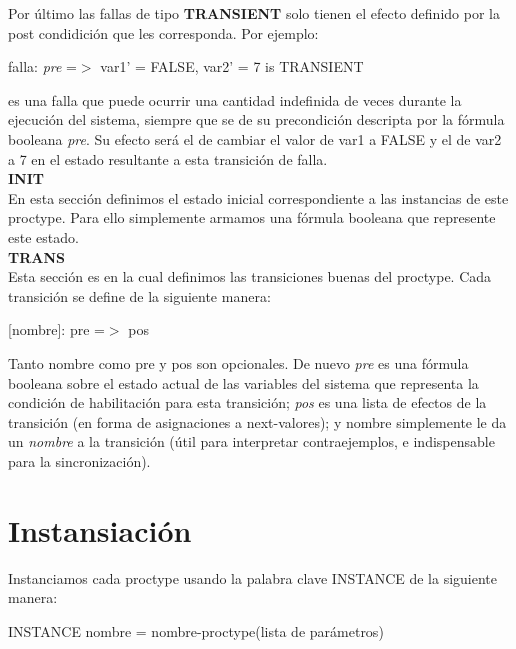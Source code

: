 \documentclass[titlepage, 12pt]{book}
\begin{document}
Por \'ultimo las fallas de tipo \textbf{TRANSIENT} solo tienen el efecto definido por la post condidici\'on que les corresponda.
Por ejemplo:
\begin{center}falla: \textit{pre} =$>$ var1' = FALSE, var2' = 7 is TRANSIENT\end{center}
es una falla que puede ocurrir una cantidad indefinida de veces durante la ejecuci\'on del sistema, siempre que se de su precondici\'on descripta por la f\'ormula booleana \textit{pre}. Su efecto ser\'a el de cambiar el valor de var1 a FALSE y el de var2 a 7 en el estado resultante a esta transici\'on de falla.\\


\noindent \textbf{INIT}\\
\indent En esta secci\'on definimos el estado inicial correspondiente a las instancias de este proctype. Para ello simplemente armamos una f\'ormula booleana que represente este estado.\\

\noindent \textbf{TRANS}\\
\indent Esta secci\'on es en la cual definimos las transiciones buenas del proctype. Cada transici\'on se define de la siguiente manera:
\begin{center}[nombre]: pre =$>$ pos\end{center}
Tanto nombre como pre y pos son opcionales. De nuevo \textit{pre} es una f\'ormula booleana sobre el estado actual de las variables del sistema que representa la condici\'on de habilitaci\'on para esta transici\'on; \textit{pos} es una lista de efectos de la transici\'on (en forma de asignaciones a next-valores); y nombre simplemente le da un \textit{nombre} a la transici\'on (\'util para interpretar contraejemplos, e indispensable para la sincronizaci\'on).\\




\section{Instansiaci\'on}

Instanciamos cada proctype usando la palabra clave INSTANCE de la siguiente manera:
\begin{center}INSTANCE nombre = nombre-proctype(lista de par\'ametros)\end{center}
\end{document}
